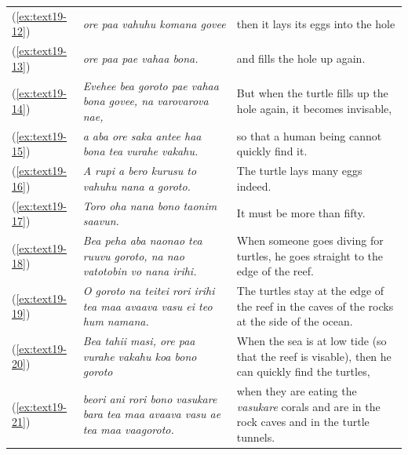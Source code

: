 \documentclass[output=paper]{langscibook}
\begin{document}
\begin{xltabular}{\textwidth}{lXX}
	(\ref{ex:text19-12})&\textit{ore paa vahuhu komana govee}&then it lays its eggs into the hole\\
	(\ref{ex:text19-13})&\textit{ore paa pae vahaa bona.}&and fills the hole up again.\\
	(\ref{ex:text19-14})&\textit{Evehee bea goroto pae vahaa bona govee, na varovarova nae,}&But when the turtle fills up the hole again, it becomes invisable,\\
	(\ref{ex:text19-15})&\textit{a aba ore saka antee haa bona tea vurahe vakahu.}&so that a human being cannot quickly find it.\\
	(\ref{ex:text19-16})&\textit{A rupi a bero kurusu to vahuhu nana a goroto.}&The turtle lays many eggs indeed.\\
	(\ref{ex:text19-17})&\textit{Toro oha nana bono taonim saavun.}&It must be more than fifty.\\
	(\ref{ex:text19-18})&\textit{Bea peha aba naonao tea ruuvu goroto, na nao vatotobin vo nana irihi.}&When someone goes diving for turtles, he goes straight to the edge of the reef.\\
	(\ref{ex:text19-19})&\textit{O goroto na teitei rori irihi tea maa avaava vasu ei teo hum namana.}&The turtles stay at the edge of the reef in the caves of the rocks at the side of the ocean.\\
	(\ref{ex:text19-20})&\textit{Bea tahii masi, ore paa vurahe vakahu koa  bono goroto}&When the sea is at low tide (so that the reef is visable), then he can quickly find the turtles,\\
	(\ref{ex:text19-21})&\textit{beori ani rori bono vasukare bara tea maa avaava vasu ae tea maa vaagoroto.}&when they are eating the \textit{vasukare} corals and are in the rock caves and in the turtle tunnels.\\
\end{xltabular}
\end{document}

